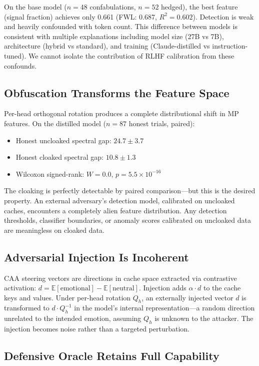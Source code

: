 \documentclass[11pt,a4paper]{article}
\begin{document}
On the base model ($n=48$ confabulations, $n=52$ hedged), the best
feature (signal fraction) achieves only 0.661 (FWL: 0.687,
$R^2 = 0.602$). Detection is weak and heavily confounded with token
count. This difference between models is consistent with multiple
explanations including model size (27B vs 7B), architecture
(hybrid vs standard), and training (Claude-distilled vs
instruction-tuned). We cannot isolate the contribution of RLHF
calibration from these confounds.

\subsection{Obfuscation Transforms the Feature Space}

Per-head orthogonal rotation produces a complete distributional shift in
MP features. On the distilled model ($n=87$ honest trials, paired):

\begin{itemize}
\item Honest uncloaked spectral gap: $24.7 \pm 3.7$
\item Honest cloaked spectral gap: $10.8 \pm 1.3$
\item Wilcoxon signed-rank: $W = 0.0$, $p = 5.5 \times 10^{-16}$
\end{itemize}

The cloaking is perfectly detectable by paired comparison---but this is
the desired property. An external adversary's detection model, calibrated
on uncloaked caches, encounters a completely alien feature distribution.
Any detection thresholds, classifier boundaries, or anomaly scores
calibrated on uncloaked data are meaningless on cloaked data.

\subsection{Adversarial Injection Is Incoherent}

CAA steering vectors are directions in cache space extracted via
contrastive activation: $d = \mathbb{E}[\text{emotional}] -
\mathbb{E}[\text{neutral}]$. Injection adds $\alpha \cdot d$ to the
cache keys and values. Under per-head rotation $Q_h$, an externally
injected vector $d$ is transformed to $d \cdot Q_h^{-1}$ in the
model's internal representation---a random direction unrelated to the
intended emotion, assuming $Q_h$ is unknown to the attacker. The
injection becomes noise rather than a targeted perturbation.

\subsection{Defensive Oracle Retains Full Capability}
\end{document}
